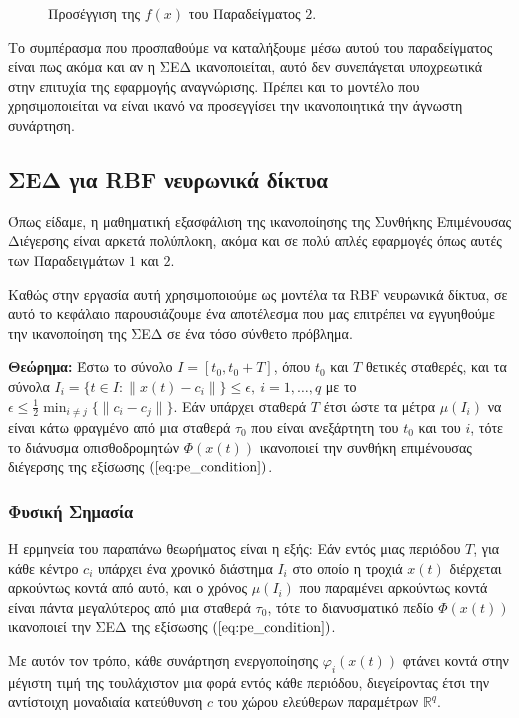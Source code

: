 \begin{figure}[h!]
\centering
\scalebox{.6}{}
\caption{ Προσέγγιση της $f(x)$ του Παραδείγματος $2$. }
\label{fig:sines_approximation}
\end{figure}

\pagebreak
Το συμπέρασμα που προσπαθούμε να καταλήξουμε μέσω αυτού του παραδείγματος είναι πως ακόμα και αν η ΣΕΔ ικανοποιείται, αυτό δεν συνεπάγεται υποχρεωτικά στην επιτυχία της εφαρμογής αναγνώρισης. Πρέπει και το μοντέλο που χρησιμοποιείται να είναι ικανό να προσεγγίσει την ικανοποιητικά την άγνωστη συνάρτηση.

\subsection{ΣΕΔ για RBF νευρωνικά δίκτυα}
Όπως είδαμε, η μαθηματική εξασφάλιση της ικανοποίησης της Συνθήκης Επιμένουσας Διέγερσης είναι αρκετά πολύπλοκη, ακόμα και σε πολύ απλές εφαρμογές όπως αυτές των Παραδειγμάτων $1$ και $2$. 

Καθώς στην εργασία αυτή χρησιμοποιούμε ως μοντέλα τα RBF νευρωνικά δίκτυα, σε αυτό το κεφάλαιο παρουσιάζουμε ένα αποτέλεσμα που μας επιτρέπει να εγγυηθούμε την ικανοποίηση της ΣΕΔ σε ένα τόσο σύνθετο πρόβλημα.

\textbf{Θεώρημα:} Έστω το σύνολο $I = [t_0, t_0 + T]$, όπου $t_0$ και $T$
θετικές σταθερές, και τα σύνολα $I_i = \{ t \in I :  \| x(t) - c_i \| \} \leq \epsilon, \: i = 1,\dots, q $ με το $\epsilon \leq \frac{1}{2} \min_{i \neq j} \{\| c_i - c_j \| \}$. Εάν υπάρχει σταθερά $T$ έτσι ώστε τα μέτρα $\mu(I_i)$ να είναι κάτω φραγμένο από μια σταθερά $\tau_0$ που είναι ανεξάρτητη του $t_0$ και του $i$, τότε το διάνυσμα οπισθοδρομητών $\varPhi(x(t))$ ικανοποιεί την συνθήκη επιμένουσας διέγερσης της εξίσωσης $(\ref{eq:pe_condition})$.

\subsubsection{Φυσική Σημασία}
Η ερμηνεία του παραπάνω θεωρήματος είναι η εξής: Εάν εντός μιας περιόδου $T$, για κάθε κέντρο $c_i$ υπάρχει ένα χρονικό διάστημα $I_i$ στο οποίο η τροχιά $x(t)$ διέρχεται αρκούντως κοντά από αυτό, και ο χρόνος $\mu (I_i)$ που παραμένει αρκούντως κοντά είναι πάντα μεγαλύτερος από μια σταθερά $\tau_0$, τότε το διανυσματικό πεδίο $\varPhi(x(t))$ ικανοποιεί την ΣΕΔ της εξίσωσης $(\ref{eq:pe_condition})$.

Με αυτόν τον τρόπο, κάθε συνάρτηση ενεργοποίησης $\varphi_i(x(t))$ φτάνει κοντά στην μέγιστη τιμή της τουλάχιστον μια φορά εντός κάθε περιόδου, διεγείροντας έτσι την αντίστοιχη μοναδιαία κατεύθυνση $c$ του χώρου ελεύθερων παραμέτρων $\mathbb{R}^q$.

